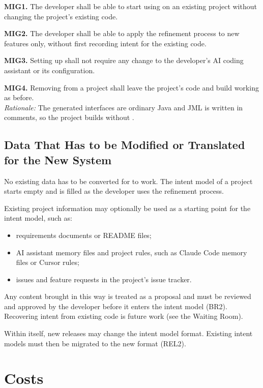 \documentclass[12pt]{article}
\begin{document}
\medskip
\noindent\textbf{MIG1.} The developer shall be able to start using \progname{}
on an existing project without changing the project's existing code.

\medskip
\noindent\textbf{MIG2.} The developer shall be able to apply the refinement
process to new features only, without first recording intent for the existing
code.

\medskip
\noindent\textbf{MIG3.} Setting up \progname{} shall not require any change to
the developer's AI coding assistant or its configuration.

\medskip
\noindent\textbf{MIG4.} Removing \progname{} from a project shall leave the
project's code and build working as before.\\
\textit{Rationale:} The generated interfaces are ordinary Java and JML is
written in comments, so the project builds without \progname{}.

\subsection{Data That Has to be Modified or Translated for the New System}

No existing data has to be converted for \progname{} to work. The intent model
of a project starts empty and is filled as the developer uses the refinement
process.

Existing project information may optionally be used as a starting point for
the intent model, such as:

\begin{itemize}
  \item requirements documents or README files;
  \item AI assistant memory files and project rules, such as Claude Code memory
  files or Cursor rules;
  \item issues and feature requests in the project's issue tracker.
\end{itemize}

Any content brought in this way is treated as a proposal and must be reviewed
and approved by the developer before it enters the intent model (BR2).
Recovering intent from existing code is future work (see the Waiting Room).

Within \progname{} itself, new releases may change the intent model format.
Existing intent models must then be migrated to the new format (REL2).

\section{Costs}
\end{document}
